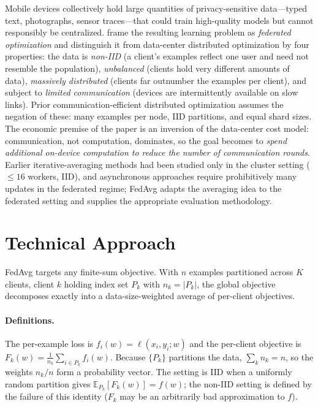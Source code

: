 \documentclass[11pt]{article}
\begin{document}
Mobile devices collectively hold large quantities of privacy-sensitive data---typed text, photographs, sensor traces---that could train high-quality models but cannot responsibly be centralized. \citet{mcmahan2017fedavg} frame the resulting learning problem as \emph{federated optimization} and distinguish it from data-center distributed optimization by four properties: the data is \emph{non-IID} (a client's examples reflect one user and need not resemble the population), \emph{unbalanced} (clients hold very different amounts of data), \emph{massively distributed} (clients far outnumber the examples per client), and subject to \emph{limited communication} (devices are intermittently available on slow links). Prior communication-efficient distributed optimization \citep{zhang2012communication,zinkevich2010parallelized} assumes the negation of these: many examples per node, IID partitions, and equal shard sizes. The economic premise of the paper is an inversion of the data-center cost model: communication, not computation, dominates, so the goal becomes to \emph{spend additional on-device computation to reduce the number of communication rounds}. Earlier iterative-averaging methods \citep{mcdonald2010distributed,povey2015parallel,zhang2015elastic} had been studied only in the cluster setting ($\leq 16$ workers, IID), and asynchronous approaches \citep{dean2012large} require prohibitively many updates in the federated regime; FedAvg adapts the averaging idea to the federated setting and supplies the appropriate evaluation methodology.

\section{Technical Approach}
\label{sec:method}

FedAvg targets any finite-sum objective. With $n$ examples partitioned across $K$ clients, client $k$ holding index set $P_k$ with $n_k=|P_k|$, the global objective decomposes exactly into a data-size-weighted average of per-client objectives.

\paragraph{Definitions.}
The per-example loss is $f_i(w)=\ell(x_i,y_i;w)$ and the per-client objective is $F_k(w)=\frac{1}{n_k}\sum_{i\in P_k} f_i(w)$. Because $\{P_k\}$ partitions the data, $\sum_k n_k = n$, so the weights $n_k/n$ form a probability vector. The setting is IID when a uniformly random partition gives $\mathbb{E}_{P_k}[F_k(w)] = f(w)$; the non-IID setting is defined by the failure of this identity ($F_k$ may be an arbitrarily bad approximation to $f$).
\end{document}
